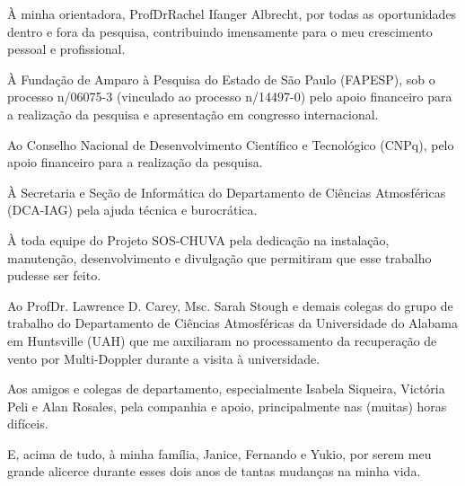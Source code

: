 \begin{agradecimentos}
À minha orientadora, Prof\textordfeminine\:Dr\textordfeminine\:Rachel Ifanger Albrecht, por todas as oportunidades dentro e fora da pesquisa, contribuindo imensamente para o meu crescimento pessoal e profissional.

À Fundação de Amparo à Pesquisa do Estado de São Paulo (FAPESP), sob o processo n\textordmasculine{}/06075-3 (vinculado ao processo n\textordmasculine{}/14497-0) pelo apoio financeiro para a realização da pesquisa e apresentação em congresso internacional.

Ao Conselho Nacional de Desenvolvimento Científico e Tecnológico (CNPq), pelo apoio financeiro para a realização da pesquisa.

À Secretaria e Seção de Informática do Departamento de Ciências Atmosféricas (DCA-IAG) pela ajuda técnica e burocrática.

À toda equipe do Projeto SOS-CHUVA pela dedicação na instalação, manutenção, desenvolvimento e divulgação que permitiram que esse trabalho pudesse ser feito.

Ao Prof\textordmasculine\:Dr. Lawrence D. Carey, Msc. Sarah Stough e demais colegas do grupo de trabalho do Departamento de Ciências Atmosféricas da Universidade do Alabama em Huntsville (UAH) que me auxiliaram no processamento da recuperação de vento por Multi-Doppler durante a visita à universidade.

Aos amigos e colegas de departamento, especialmente Isabela Siqueira, Victória Peli e Alan Rosales, pela companhia e apoio, principalmente nas (muitas) horas difíceis.

E, acima de tudo, à minha família, Janice, Fernando e Yukio, por serem meu grande alicerce durante esses dois anos de tantas mudanças na minha vida.
\end{agradecimentos}

